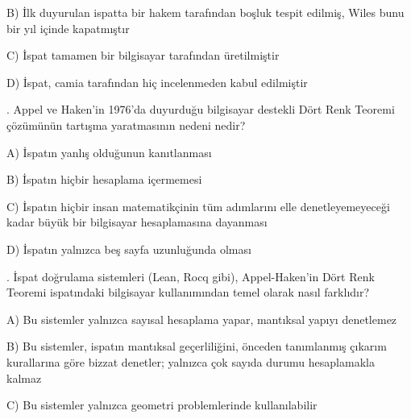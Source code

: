 \par\noindent\hspace*{1.6em}B) İlk duyurulan ispatta bir hakem tarafından boşluk tespit edilmiş, Wiles bunu bir yıl içinde kapatmıştır

\par\noindent\hspace*{1.6em}C) İspat tamamen bir bilgisayar tarafından üretilmiştir

\par\noindent\hspace*{1.6em}D) İspat, camia tarafından hiç incelenmeden kabul edilmiştir

\par\smallskip{}. Appel ve Haken’in 1976’da duyurduğu bilgisayar destekli Dört Renk Teoremi çözümünün tartışma yaratmasının nedeni nedir?

\par\noindent\hspace*{1.6em}A) İspatın yanlış olduğunun kanıtlanması

\par\noindent\hspace*{1.6em}B) İspatın hiçbir hesaplama içermemesi

\par\noindent\hspace*{1.6em}C) İspatın hiçbir insan matematikçinin tüm adımlarını elle denetleyemeyeceği kadar büyük bir bilgisayar hesaplamasına dayanması

\par\noindent\hspace*{1.6em}D) İspatın yalnızca beş sayfa uzunluğunda olması

\par\smallskip{}. İspat doğrulama sistemleri (Lean, Rocq gibi), Appel-Haken’in Dört Renk Teoremi ispatındaki bilgisayar kullanımından temel olarak nasıl farklıdır?

\par\noindent\hspace*{1.6em}A) Bu sistemler yalnızca sayısal hesaplama yapar, mantıksal yapıyı denetlemez

\par\noindent\hspace*{1.6em}B) Bu sistemler, ispatın mantıksal geçerliliğini, önceden tanımlanmış çıkarım kurallarına göre bizzat denetler; yalnızca çok sayıda durumu hesaplamakla kalmaz

\par\noindent\hspace*{1.6em}C) Bu sistemler yalnızca geometri problemlerinde kullanılabilir

